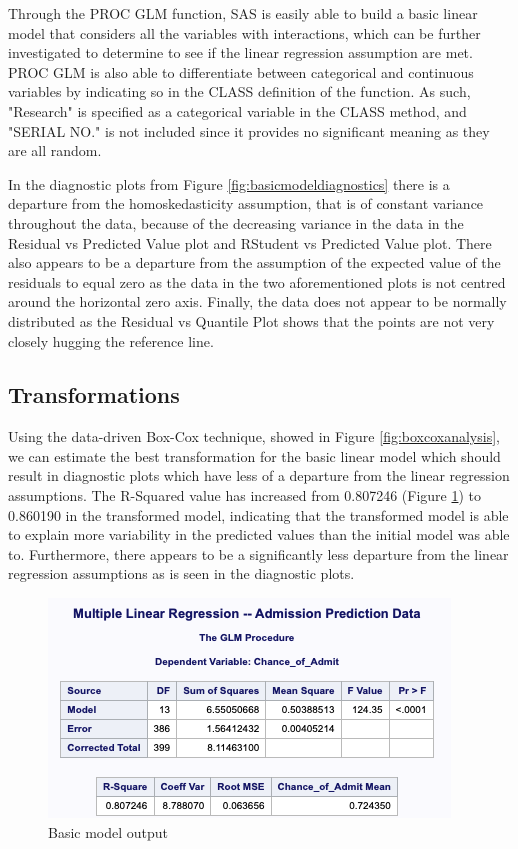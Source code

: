 \documentclass{article}
\begin{document}
Through the PROC GLM function, SAS is easily able to build a basic linear model that considers all the variables with interactions, which can be further investigated to determine to see if the linear regression assumption are met. PROC GLM is also able to differentiate between categorical and continuous variables by indicating so in the CLASS definition of the function. As such, "Research" is specified as a categorical variable in the CLASS method, and "SERIAL NO." is not included since it provides no significant meaning as they are all random.

In the diagnostic plots from Figure \ref{fig:basicmodeldiagnostics} there is a departure from the homoskedasticity assumption, that is of constant variance throughout the data, because of the decreasing variance in the data in the Residual vs Predicted Value plot and RStudent vs Predicted Value plot. There also appears to be a departure from the assumption of the expected value of the residuals to equal zero as the data in the two aforementioned plots is not centred around the horizontal zero axis. Finally, the data does not appear to be normally distributed as the Residual vs Quantile Plot shows that the points are not very closely hugging the reference line.

\subsection*{Transformations}
Using the data-driven Box-Cox technique, showed in Figure \ref{fig:boxcoxanalysis}, we can estimate the best transformation for the basic linear model which should result in diagnostic plots which have less of a departure from the linear regression assumptions. The R-Squared value has increased from 0.807246 (Figure \ref{fig:basicmodeloutput}) to 0.860190 in the transformed model, indicating that the transformed model is able to explain more variability in the predicted values than the initial model was able to. Furthermore, there appears to be a significantly less departure from the linear regression assumptions as is seen in the diagnostic plots.


\begin{figure}
\includegraphics[scale=1]{basic_model_output.png}
\caption{Basic model output}
\label{fig:basicmodeloutput}
\end{figure}
\end{document}
